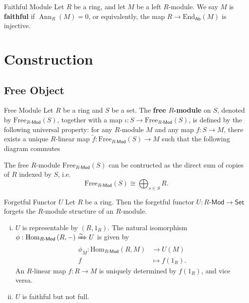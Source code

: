 \begin{definition}{Faithful Module}{}
    Let $R$ be a ring, and let $M$ be a left $R$-module. We say $M$ is \textbf{faithful} if $\operatorname{Ann}_R(M)=0$, or equivalently, the map $R\to \mathrm{End}_{\mathsf{Ab}}(M)$ is injective.
\end{definition}


\section{Construction}
\subsection{Free Object}
\begin{definition}{Free Module}{}
    Let $R$ be a ring and $S$ be a set. The \textbf{free $R$-module } on $S$, denoted by $\mathrm{Free}_{R\text{-}\mathsf{Mod}}(S)$, together with a map $\iota:S\to \mathrm{Free}_{R\text{-}\mathsf{Mod}}(S)$, is defined by the following universal property: for any $R$-module $M$ and any map $f:S\to M$, there exists a unique $R$-linear map $\widetilde{f}:\mathrm{Free}_{R\text{-}\mathsf{Mod}}(S)\to M$ such that the following diagram commutes
    \begin{center}
    \end{center}
    The free $R$-module $\mathrm{Free}_{R\text{-}\mathsf{Mod}}(S)$ can be contructed as the direct sum of copies of $R$ indexed by $S$, i.e. 
    \[
        \mathrm{Free}_{R\text{-}\mathsf{Mod}}(S)\cong \bigoplus_{s\in S}R.
    \]
\end{definition}


\begin{example}{Forgetful Functor $U$}{}
    Let $R$ be a ring. Then the forgetful functor $U:R\text{-}\mathsf{Mod}\to \mathsf{Set}$ forgets the $R$-module structure of an $R$-module. 
    \begin{enumerate}[(i)]
        \item $U$ is representable by $\left(R, 1_R\right)$. The natural isomorphism $\phi:\mathrm{Hom}_{R\text{-}\mathsf{Mod}}\left(R, -\right)\xRightarrow{\sim} U$ is given by 
        \begin{align*}
            \phi_M:\mathrm{Hom}_{R\text{-}\mathsf{Mod}}\left(R, M\right)&\longrightarrow U(M)\\
            f&\longmapsto f(1_R).
        \end{align*}
        An $R$-linear map $f:R\to M$ is uniquely determined by $f(1_R)$, and vice versa.
        \item $U$ is faithful but not full.
    \end{enumerate}
\end{example}
 

